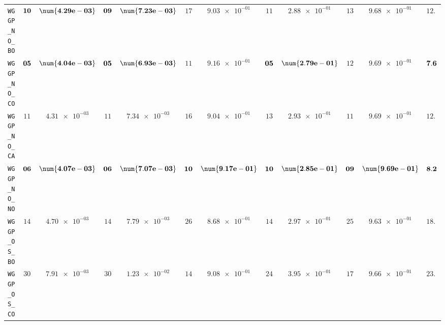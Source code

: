 \begin{table}[H]
\begin{tabularx}{\textwidth}{l||cC|cC|cC|cC|cC||c}
		\texttt{WGGP\_NO\_BO} & $\bf 10$ & $\bf \num{4.29e-03}$ & $\bf 09$ & $\bf \num{7.23e-03}$ & $ 17$ & $ \num{9.03e-01}$ & $ 11$ & $ \num{2.88e-01}$ & $ 13$ & $ \num{9.68e-01}$ & $ 12.0$  \\
		\texttt{WGGP\_NO\_CO} & $\bf 05$ & $\bf \num{4.04e-03}$ & $\bf 05$ & $\bf \num{6.93e-03}$ & $ 11$ & $ \num{9.16e-01}$ & $\bf 05$ & $\bf \num{2.79e-01}$ & $ 12$ & $ \num{9.69e-01}$ & $\bf 7.6$  \\
		\texttt{WGGP\_NO\_CA} & $ 11$ & $ \num{4.31e-03}$ & $ 11$ & $ \num{7.34e-03}$ & $ 16$ & $ \num{9.04e-01}$ & $ 13$ & $ \num{2.93e-01}$ & $ 11$ & $ \num{9.69e-01}$ & $ 12.4$  \\
		\texttt{WGGP\_NO\_NO} & $\bf 06$ & $\bf \num{4.07e-03}$ & $\bf 06$ & $\bf \num{7.07e-03}$ & $\bf 10$ & $\bf \num{9.17e-01}$ & $\bf 10$ & $\bf \num{2.85e-01}$ & $\bf 09$ & $\bf \num{9.69e-01}$ & $\bf 8.2$  \\
		\texttt{WGGP\_OS\_BO} & $ 14$ & $ \num{4.70e-03}$ & $ 14$ & $ \num{7.79e-03}$ & $ 26$ & $ \num{8.68e-01}$ & $ 14$ & $ \num{2.97e-01}$ & $ 25$ & $ \num{9.63e-01}$ & $ 18.6$  \\
		\texttt{WGGP\_OS\_CO} & $ 30$ & $ \num{7.91e-03}$ & $ 30$ & $ \num{1.23e-02}$ & $ 14$ & $ \num{9.08e-01}$ & $ 24$ & $ \num{3.95e-01}$ & $ 17$ & $ \num{9.66e-01}$ & $ 23.0$  \\

\end{tabularx}
\end{table}
